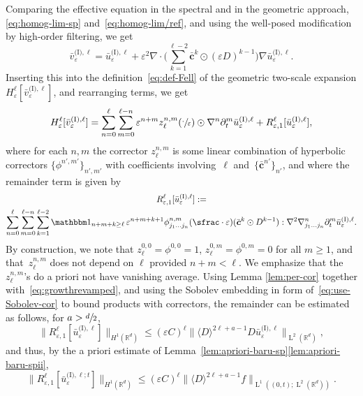 \documentclass[10pt]{amsart}
\let\mathds\mathbbm
\theoremstyle{plain}
\theoremstyle{definition}
\numberwithin{equation}{section}
\newcommand{\e}{\varepsilon}
\newcommand{\R}{\mathbb R}
\newcommand{\cc}{{\boldsymbol c}}
\newcommand{\Ld}{\operatorname{L}}
\begin{document}
Comparing the effective equation in the spectral and in the geometric approach, \cf \eqref{eq:homog-lim-sp} and~\eqref{eq:homog-lim/ref}, and using the well-posed modification by high-order filtering, we get\vspace*{-3pt}
\begin{equation}\label{eq:u_and_v}
\bar v_\e^{\text{(I)},\ell}=\bar u_\e^{\text{(I)},\ell}+\e^2\nabla\cdot\Big(\sum_{k=1}^{\ell-2}\bar\cc^k\odot(\e D)^{k-1}\Big)\nabla \bar u_\e^{\text{(I)},\ell}.
\end{equation}
Inserting this into the definition~\eqref{eq:def-Fell} of the geometric two-scale expansion $H_{\e}^{\ell}[\bar v_{\e}^{\text{(I)},\ell}]$, and rearranging terms, we get\vspace*{-3pt}
\begin{equation}\label{eq:decomp-Fell-Rell}
H^\ell_\e[\bar v_\e^{\text{(I)},\ell}]=\sum_{n=0}^\ell\sum_{m=0}^{\ell-n}\e^{n+m}z^{n,m}_\ell(\sfrac{\cdot}{\e})\odot\nabla^n\partial_t^{m}\bar u_\e^{\text{(I)},\ell}+ R^{\ell}_{\e,1}[\bar u_{\e}^{\text{(I)},\ell}],
\end{equation}
{where for each $n,m$ the corrector $z^{n,m}_\ell$ is some linear combination of hyperbolic correctors $\{\phi^{n',m'}\}_{n',m'}$ with coefficients involving~$\ell$ and~$\{\bar\cc^{n'}\}_{n'}$,} and where the remainder term is given by
\begin{multline*}
R^{\ell}_{\e,1}[\bar u_{\e}^{\text{(I)},\ell}]:=\\
\sum_{n=0}^\ell\sum_{m=0}^{\ell-n}\sum_{k=1}^{\ell-2}\mathds1_{n+m+k\ge\ell}\,\e^{n+m+k+1} \phi^{n,m}_{j_1\ldots j_n}(\sfrac\cdot\e)(\bar\cc^k\odot D^{k-1}):\nabla^2\nabla_{j_1\ldots j_n}^n\partial_t^{m}\bar u_\e^{\text{(I)},\ell}.
\end{multline*}
By construction, we note that $z^{0,0}_\ell=\phi^{0,0}=1$, $z^{0,m}_\ell=\phi^{0,m}=0$ for all $m\ge1$, and that~$z^{n,m}_\ell$ does not depend on $\ell$ provided $n+m<\ell$. We emphasize that the $z^{n,m}_\ell$'s do a priori not have vanishing average.
Using Lemma \ref{lem:per-cor} together with~\eqref{eq:growthrevamped}, and using the Sobolev embedding in form of~\eqref{eq:use-Sobolev-cor} to bound products with correctors, the remainder can be estimated as follows, for $a>\sfrac d2$,
\begin{equation*}
\|R^{\ell}_{\e,1}[\bar u_{\e}^{\text{(I)},\ell}]\|_{H^1(\R^d)}\le (\e C)^{\ell}\|\langle D\rangle^{2\ell+a-1}D\bar u_{\e}^{\text{(I)},\ell}\|_{\Ld^2(\R^d)},
\end{equation*}
and thus, by the a priori estimate of Lemma~\ref{lem:apriori-baru-sp}\eqref{lem:apriori-baru-spii},
\begin{equation}\label{eq:final_bound_error1}
\|R^{\ell}_{\e,1}[\bar u_{\e}^{\text{(I)},\ell;t}]\|_{H^1(\R^d)}\leq (\e C)^{\ell}\|\langle D\rangle^{2\ell+a-{1}}f\|_{\Ld^1((0,t);\Ld^2(\R^d))}.
\end{equation}
\end{document}
